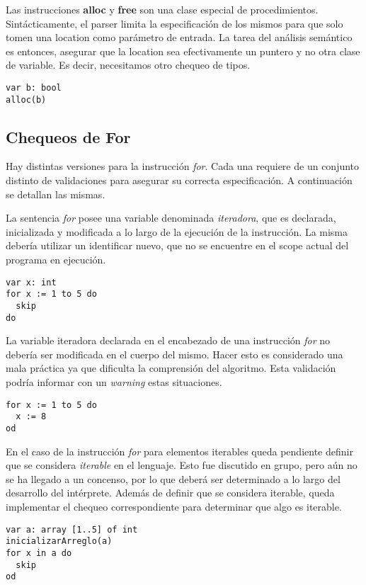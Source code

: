 \documentclass{article}
\begin{document}
Las instrucciones \textbf{alloc} y \textbf{free} son una clase especial de procedimientos.
Sintácticamente, el parser limita la especificación de los mismos para que solo tomen una location como parámetro de entrada.
La tarea del análisis semántico es entonces, asegurar que la location sea efectivamente un puntero y no otra clase de variable.
Es decir, necesitamos otro chequeo de tipos.
\begin{lstlisting}
var b: bool
alloc(b)
\end{lstlisting}

\subsection{Chequeos de For}

Hay distintas versiones para la instrucción \textit{for}.
Cada una requiere de un conjunto distinto de validaciones para asegurar su correcta especificación.
A continuación se detallan las mismas.

La sentencia \textit{for} posee una variable denominada \textit{iteradora}, que es declarada, inicializada y modificada a lo largo de la ejecución de la instrucción.
La misma debería utilizar un identificar nuevo, que no se encuentre en el scope actual del programa en ejecución.
\begin{lstlisting}
var x: int
for x := 1 to 5 do
  skip
do
\end{lstlisting}

La variable iteradora declarada en el encabezado de una instrucción \textit{for} no debería ser modificada en el cuerpo del mismo.
Hacer esto es considerado una mala práctica ya que dificulta la comprensión del algoritmo.
Esta validación podría informar con un \textit{warning} estas situaciones.
\begin{lstlisting}
for x := 1 to 5 do
  x := 8
od
\end{lstlisting}

En el caso de la instrucción \textit{for} para elementos iterables queda pendiente definir que se considera \textit{iterable} en el lenguaje.
Esto fue discutido en grupo, pero aún no se ha llegado a un concenso, por lo que deberá ser determinado a lo largo del desarrollo del intérprete.
Además de definir que se considera iterable, queda implementar el chequeo correspondiente para determinar que algo es iterable.
\begin{lstlisting}
var a: array [1..5] of int
inicializarArreglo(a)
for x in a do
  skip
od
\end{lstlisting}
\end{document}
